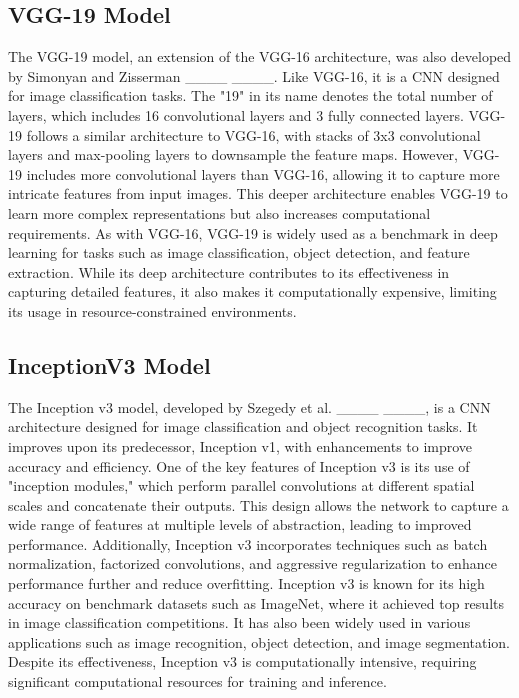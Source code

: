 \subsection{VGG-19 Model}
The VGG-19 model, an extension of the VGG-16 architecture, was also developed by Simonyan and Zisserman ____ ____. Like VGG-16, it is a CNN designed for image classification tasks. The "19" in its name denotes the total number of layers, which includes 16 convolutional layers and 3 fully connected layers. VGG-19 follows a similar architecture to VGG-16, with stacks of 3x3 convolutional layers and max-pooling layers to downsample the feature maps. However, VGG-19 includes more convolutional layers than VGG-16, allowing it to capture more intricate features from input images. This deeper architecture enables VGG-19 to learn more complex representations but also increases computational requirements. As with VGG-16, VGG-19 is widely used as a benchmark in deep learning for tasks such as image classification, object detection, and feature extraction. While its deep architecture contributes to its effectiveness in capturing detailed features, it also makes it computationally expensive, limiting its usage in resource-constrained environments.

\subsection{InceptionV3 Model}
The Inception v3 model, developed by Szegedy et al. ____ ____, is a CNN architecture designed for image classification and object recognition tasks. It improves upon its predecessor, Inception v1, with enhancements to improve accuracy and efficiency. One of the key features of Inception v3 is its use of "inception modules," which perform parallel convolutions at different spatial scales and concatenate their outputs. This design allows the network to capture a wide range of features at multiple levels of abstraction, leading to improved performance. Additionally, Inception v3 incorporates techniques such as batch normalization, factorized convolutions, and aggressive regularization to enhance performance further and reduce overfitting. Inception v3 is known for its high accuracy on benchmark datasets such as ImageNet, where it achieved top results in image classification competitions. It has also been widely used in various applications such as image recognition, object detection, and image segmentation. Despite its effectiveness, Inception v3 is computationally intensive, requiring significant computational resources for training and inference.

